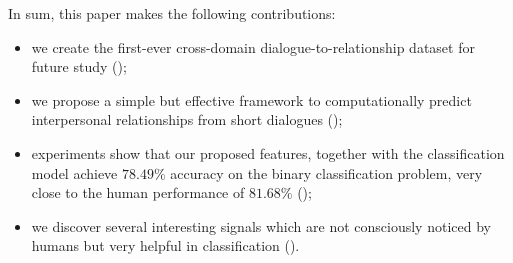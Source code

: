 In sum, this paper makes the following contributions:
\begin{itemize}
\item we create the first-ever cross-domain dialogue-to-relationship dataset 
for future study ();
\item we propose a simple but effective framework to computationally predict
interpersonal relationships from short dialogues ();
\item experiments show that our proposed features, together with the 
classification model achieve $78.49\%$ accuracy on the binary 
classification problem, very close to the human performance of $81.68\%$ ();
\item we discover several interesting signals which are not consciously
noticed by humans but very helpful in classification ().
\end{itemize}

